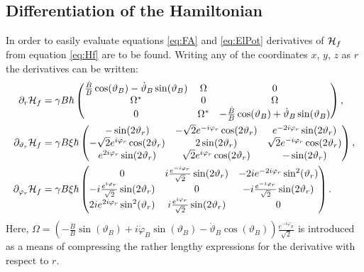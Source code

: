 \documentclass[a4paper]{article}
\begin{document}
\subsection{Differentiation of the Hamiltonian}\label{sec:Hdiff}
In order to easily evaluate equations \ref{eq:FA} and \ref{eq:ElPot} derivatives of
\(\mathbb{\cal H}_f\) from equation \ref{eq:Hf} are to be found. Writing any of the coordinates \(x\), \(y\), \(z\)
as \(r\) the derivatives can
be written:
\begin{align}\label{eq:diffham}
        \partial_r\mathbb{\cal H}_f  &= \gamma B \hbar{} \pmqty{
 \frac{\dot B}{B}\cos(\vartheta_B) -\dot \vartheta_B \sin(\vartheta_B) & \Omega & 0 \\
 \Omega^{*} & 0 & \Omega\\
 0 & \Omega^{*}& -\frac{\dot B}{B}\cos(\vartheta_B) + \dot \vartheta_B \sin(\vartheta_B)
        }, \nonumber\\
        \partial_{\vartheta_r} \mathbb{\cal H}_f &= \gamma B \xi \hbar{}\pmqty{
                -\sin(2\vartheta_r) & -\sqrt{2}  e^{-i\varphi_r}\cos(2\vartheta_r) &
                 e^{-2i\varphi_r}\sin(2\vartheta_r)\\
                -\sqrt{2}  e^{i\varphi_r}\cos(2\vartheta_r) & 2\sin(2\vartheta_r) &
                \sqrt{2} e^{-i\varphi_r}\cos(2\vartheta_r)\\
                 e^{2i\varphi_r}\sin(2\vartheta_r) & \sqrt{2} 
                e^{i\varphi_r}\cos(2\vartheta_r) & -\sin(2\vartheta_r)
        }, \nonumber\\
        \partial_{\varphi_r} \mathbb{\cal H}_f &= \gamma B \xi \hbar{}\pmqty{
                0 & i  \frac{e^{-i\varphi_r}}{\sqrt{2} }\sin(2\vartheta_r) &
                -2i e^{-2i\varphi_r}\sin[2](\vartheta_r)\\
                -i  \frac{e^{i\varphi_r}}{\sqrt{2} }\sin(2\vartheta_r) & 0 & -i 
                \frac{e^{-i\varphi_r}}{\sqrt{2} }\sin(2\vartheta_r) \\
                2i e^{2i\varphi_r}\sin[2](\vartheta_r) & i \frac{e^{i\varphi_r}}{\sqrt{2}
                }\sin(2\vartheta_r) & 0
        }
.\end{align}
Here, \(\Omega = (-\frac{\dot B}{B}\sin(\vartheta_B) + i\dot \varphi_B 
 \sin(\vartheta_B) -\dot \vartheta_B \cos(\vartheta_B)) \frac{e^{-i\varphi_B}}{\sqrt{2}}\) is introduced as a means of compressing the
rather lengthy expressions for the derivative with respect to \(r\).
\end{document}

